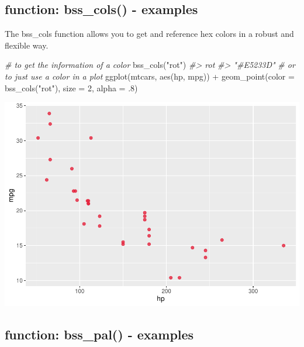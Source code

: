 \documentclass[
]{article}
\newenvironment{Shaded}{\begin{snugshade}}{\end{snugshade}}
\newcommand{\AttributeTok}[1]{\textcolor[rgb]{0.77,0.63,0.00}{#1}}
\newcommand{\CommentTok}[1]{\textcolor[rgb]{0.56,0.35,0.01}{\textit{#1}}}
\newcommand{\DecValTok}[1]{\textcolor[rgb]{0.00,0.00,0.81}{#1}}
\newcommand{\FunctionTok}[1]{\textcolor[rgb]{0.00,0.00,0.00}{#1}}
\newcommand{\NormalTok}[1]{#1}
\newcommand{\SpecialCharTok}[1]{\textcolor[rgb]{0.00,0.00,0.00}{#1}}
\newcommand{\StringTok}[1]{\textcolor[rgb]{0.31,0.60,0.02}{#1}}
\begin{document}
\hypertarget{function-bss_cols---examples}{%
\subsection{function: bss\_cols() -
examples}\label{function-bss_cols---examples}}

The bss\_cols function allows you to get and reference hex colors in a
robust and flexible way.

\begin{Shaded}
\begin{Highlighting}[]
\CommentTok{\# to get the information of a color}
\FunctionTok{bss\_cols}\NormalTok{(}\StringTok{"rot"}\NormalTok{)}
\CommentTok{\#\textgreater{}       rot }
\CommentTok{\#\textgreater{} "\#E5233D"}
\CommentTok{\# or to just use a color in a plot}
\FunctionTok{ggplot}\NormalTok{(mtcars, }\FunctionTok{aes}\NormalTok{(hp, mpg)) }\SpecialCharTok{+}
  \FunctionTok{geom\_point}\NormalTok{(}\AttributeTok{color =} \FunctionTok{bss\_cols}\NormalTok{(}\StringTok{"rot"}\NormalTok{),}
             \AttributeTok{size =} \DecValTok{2}\NormalTok{, }\AttributeTok{alpha =}\NormalTok{ .}\DecValTok{8}\NormalTok{)}
\end{Highlighting}
\end{Shaded}

\includegraphics[width=1\linewidth]{man/figures/README-bss_cols-1}

\hypertarget{function-bss_pal---examples}{%
\subsection{function: bss\_pal() -
examples}\label{function-bss_pal---examples}}
\end{document}
